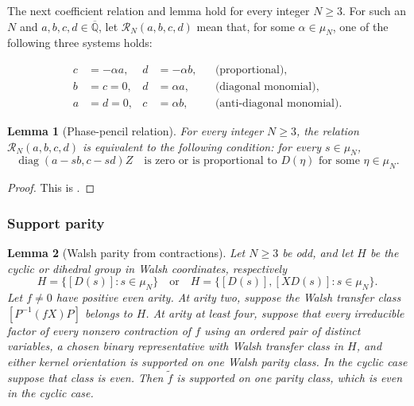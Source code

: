 \documentclass[11pt,letterpaper,onecolumn]{article}
\theoremstyle{plain}
\newtheorem{lemma}[lemma]{Lemma}
\theoremstyle{definition}
\theoremstyle{remark}
\newcommand{\AlgNums}{\overline{\mathbb Q}}
\newcommand{\diag}{\operatorname{diag}}
\begin{document}
	The next coefficient relation and lemma hold for every integer
	\(N\ge3\). For such an \(N\) and
	\(a,b,c,d\in\AlgNums\), let \(\mathcal R_N(a,b,c,d)\) mean that, for some
	\(\alpha\in\mu_N\), one of the following three systems holds:
	
	\begin{align}
		c&=-\alpha a,&d&=-\alpha b,
		&&\text{(proportional)},
		\label{eq:odd-dih-R-proportional}\\
		b&=c=0,&d&=\alpha a,
		&&\text{(diagonal monomial)},
		\label{eq:odd-dih-R-diagonal}\\
		a&=d=0,&c&=\alpha b,
		&&\text{(anti-diagonal monomial)}.
		\label{eq:odd-dih-R-antidiagonal}
	\end{align}
	
	
	\begin{lemma}[Phase-pencil relation]
		\label{lem:odd-dih-RN}
		For every integer \(N\ge3\), the relation
		\(\mathcal R_N(a,b,c,d)\) is equivalent to the following
		condition: for every \(s\in\mu_N\),
		\[
		\diag(a-sb,c-sd)Z
		\quad\text{is zero or is proportional to }D(\eta)
		\text{ for some }\eta\in\mu_N.
		\]
	\end{lemma}
	
	\begin{proof}
		This is \cite[Lemma~7.1]{Liu2026DEQ2Holant}.
	\end{proof}
	
	\subsubsection{Support parity}
	\label{subsec:odd-dih-parity}
	
	\begin{lemma}[Walsh parity from contractions]
		\label{lem:odd-dih-all-arity-parity}
		Let \(N\ge3\) be odd, and let \(H\) be the cyclic or dihedral group
		in Walsh coordinates, respectively
		\[
		H=\{[D(s)]:s\in\mu_N\}
		\quad\text{or}\quad
		H=\{[D(s)],[XD(s)]:s\in\mu_N\}.
		\]
		Let \(f\ne0\) have positive even arity. At arity two, suppose the
		Walsh transfer class \([P^{-1}(fX)P]\) belongs to \(H\).  At arity at least four, suppose that every irreducible factor of every nonzero contraction of \(f\) using an ordered pair of distinct
		variables, a chosen binary representative with Walsh transfer class in \(H\), and either kernel orientation is supported on
		one Walsh parity class. In the cyclic case suppose that class is even.  Then
		\(\widetilde f\) is supported on one parity class, which is even in the
		cyclic case.
	\end{lemma}
	
\end{document}
